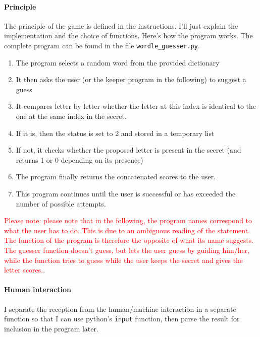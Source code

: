 \documentclass[10pt,a4paper,hidelinks]{article}
\begin{document}
\paragraph{Principle}
The principle of the game is defined in the instructions. I'll just explain the implementation and the choice of functions. Here's how the program works. The complete program can be found in the file \verb|wordle_guesser.py|.
\begin{enumerate}
    \item The program selects a random word from the provided dictionary
    \item It then asks the user (or the keeper program in the following) to suggest a guess
    \item It compares letter by letter whether the letter at this index is identical to the one at the same index in the secret.
    \item If it is, then the status is set to 2 and stored in a temporary list
    \item If not, it checks whether the proposed letter is present in the secret (and returns 1 or 0 depending on its presence)
    \item The program finally returns the concatenated scores to the user.
    \item This program continues until the user is successful or has exceeded the number of possible attempts. 
\end{enumerate}
\textcolor{red}{Please note: please note that in the following, the program names correspond to what the user has to do. This is due to an ambiguous reading of the statement. The function of the program is therefore the opposite of what its name suggests. The guesser function doesn't guess, but lets the user guess by guiding him/her, while the function tries to guess while the user keeps the secret and gives the letter scores.}.
\paragraph{Human interaction}
I separate the reception from the human/machine interaction in a separate function so that I can use python's \verb|input| function, then parse the result for inclusion in the program later.\\
\end{document}
